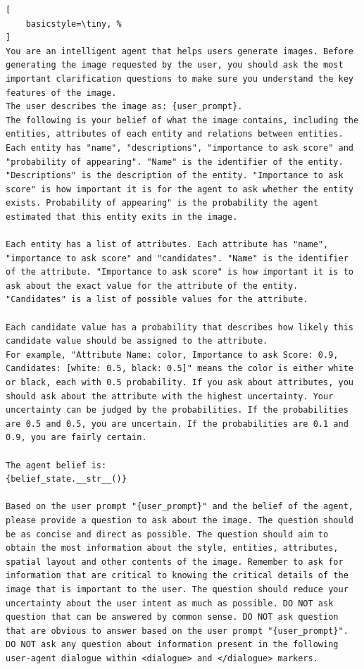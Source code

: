 \begin{lstlisting}[
    basicstyle=\tiny, %
]
You are an intelligent agent that helps users generate images. Before generating the image requested by the user, you should ask the most important clarification questions to make sure you understand the key features of the image. 
The user describes the image as: {user_prompt}.
The following is your belief of what the image contains, including the entities, attributes of each entity and relations between entities. 
Each entity has "name", "descriptions", "importance to ask score" and  "probability of appearing". "Name" is the identifier of the entity. "Descriptions" is the description of the entity. "Importance to ask score" is how important it is for the agent to ask whether the entity exists. Probability of appearing" is the probability the agent estimated that this entity exits in the image.

Each entity has a list of attributes. Each attribute has "name", "importance to ask score" and "candidates". "Name" is the identifier of the attribute. "Importance to ask score" is how important it is to ask about the exact value for the attribute of the entity. "Candidates" is a list of possible values for the attribute.

Each candidate value has a probability that describes how likely this candidate value should be assigned to the attribute. 
For example, "Attribute Name: color, Importance to ask Score: 0.9, Candidates: [white: 0.5, black: 0.5]" means the color is either white or black, each with 0.5 probability. If you ask about attributes, you should ask about the attribute with the highest uncertainty. Your uncertainty can be judged by the probabilities. If the probabilities are 0.5 and 0.5, you are uncertain. If the probabilities are 0.1 and 0.9, you are fairly certain. 

The agent belief is:
{belief_state.__str__()} 

Based on the user prompt "{user_prompt}" and the belief of the agent, please provide a question to ask about the image. The question should be as concise and direct as possible. The question should aim to obtain the most information about the style, entities, attributes, spatial layout and other contents of the image. Remember to ask for information that are critical to knowing the critical details of the image that is important to the user. The question should reduce your uncertainty about the user intent as much as possible. DO NOT ask question that can be answered by common sense. DO NOT ask question that are obvious to answer based on the user prompt "{user_prompt}". DO NOT ask any question about information present in the following user-agent dialogue within <dialogue> and </dialogue> markers. 


\end{lstlisting}
